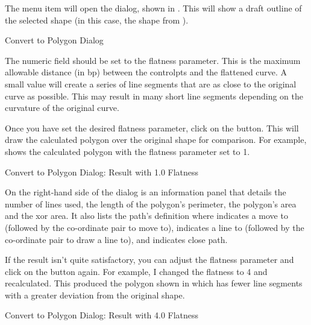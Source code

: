 
The  menu item will open the
 dialog, shown in .
This will show a draft outline of the selected shape (in this case,
the shape from ).

{}
{Convert to Polygon Dialog}


The  numeric field should be set to the
flatness parameter. This is the maximum allowable distance (in \gls{bp})
between the \glspl{controlpt} and the flattened \gls{curve}. A small
value will create a series of line segments that are as close to the
original curve as possible. This may result in many short line
segments depending on the curvature of the original \gls{curve}.


Once you have set the desired flatness parameter, click on the
 button. This will draw the calculated
polygon over the original shape for comparison. For example, 
 shows the calculated polygon with
the flatness parameter set to 1.

{}
{Convert to Polygon Dialog: Result with 1.0 Flatness}

On the right-hand side of the  dialog is an
information panel that details the number of lines used, the length
of the polygon's perimeter, the polygon's area and the \gls{xor} area.
It also lists the path's definition where  indicates a move to
(followed by the co-ordinate pair to move to),  indicates a line to
(followed by the co-ordinate pair to draw a line to), and 
indicates close path.

If the result isn't quite satisfactory, you can adjust the flatness
parameter and click on the  button again.
For example, I changed the flatness to 4 and recalculated. This
produced the polygon shown in  which
has fewer line segments with a greater deviation from the original
shape.

{}
{Convert to Polygon Dialog: Result with 4.0 Flatness}


